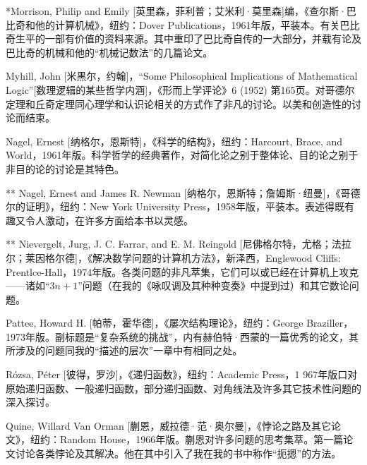 \begin{thebib}
\begin{biblist}
\item {*}Morrison, Philip and Emily [英里森，菲利普；艾米利·莫里森]编，《查尔斯·巴比奇和他的计算机械》，纽约：Dover Publications，1961年版，平装本。有关巴比奇生平的一部有价值的资料来源。其中重印了巴比奇自传的一大部分，并载有论及巴比奇的机械和他的“机械记数法”的几篇论文。

\item Myhill, John [米黑尔，约翰]，“Some Philosophical Implications of Mathematical Logic”[数理逻辑的某些哲学内涵]，《形而上学评论》6 (1952) 第165页。对哥德尔定理和丘奇定理同心理学和认识论相关的方式作了非凡的讨论。以美和创造性的讨论而结束。

\item Nagel, Ernest [纳格尔，恩斯特]，《科学的结构》，纽约：Harcourt, Brace, and World，1961年版。科学哲学的经典著作，对简化论之别于整体论、目的论之别于非目的论的讨论是其特色。

\item[**] Nagel, Ernest and James R. Newman [纳格尔，恩斯特；詹姆斯·纽曼]，《哥德尔的证明》，纽约：New York University Press，1958年版，平装本。表述得既有趣又令人激动，在许多方面给本书以灵感。

\item[**] Nievergelt, Jurg, J. C. Farrar, and E. M. Reingold [尼佛格尔特，尤格；法拉尔；莱因格尔德]，《解决数学问题的计算机方法》，新泽西，Englewood Cliffs: Prentlce-Hall，1974年版。各类问题的非凡萃集，它们可以或已经在计算机上攻克——诸如“$3n+1$”问题（在我的《咏叹调及其种种变奏》中提到过）和其它数论问题。

\item Pattee, Howard H. [帕蒂，霍华德]，《屡次结构理论》，纽约：George Braziller，1973年版。副标题是“复杂系统的挑战”，内有赫伯特·西蒙的一篇优秀的论文，其所涉及的问题同我的“描述的层次”一章中有相同之处。

\item Rózsa, Péter [彼得，罗沙]，《递归函数》，纽约：Academic Press，1 967年版口对原始递归函数、一般递归函数，部分递归函数、对角线法及许多其它技术性问题的深入探讨。

\item Quine, Willard Van Orman [蒯恩，威拉德·范·奥尔曼]，《悖论之路及其它论文》，纽约：Random House，1966年版。蒯恩对许多问题的思考集萃。第一篇论文讨论各类悖论及其解决。他在其中引入了我在我的书中称作“扼摁”的方法。


\end{biblist}
\end{thebib}
